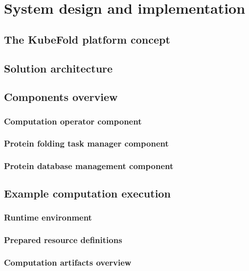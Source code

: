 \chapter{System design and implementation}


\section{The KubeFold platform concept}


\section{Solution architecture}


\section{Components overview}

\subsection{Computation operator component}

\subsection{Protein folding task manager component}

\subsection{Protein database management component}


\section{Example computation execution}

\subsection{Runtime environment}

\subsection{Prepared resource definitions}

\subsection{Computation artifacts overview}